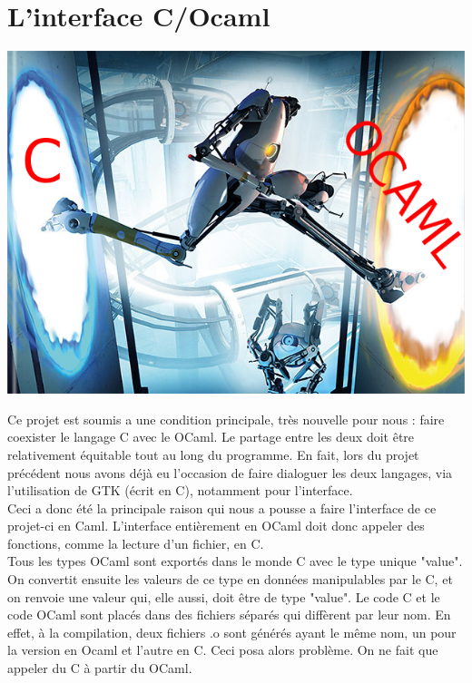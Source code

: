 \documentclass[12pt,a4paper]{report}
\begin{document}
\chapter{L'interface C/Ocaml}

\begin{center}
\includegraphics[scale=0.5]{COcaml.jpg}
\end{center}

Ce projet est soumis a une condition principale, très nouvelle pour nous : faire coexister le langage C avec le OCaml. Le partage entre les deux doit être relativement équitable tout au long du programme. En fait, lors du projet précédent nous avons déjà eu l'occasion de faire dialoguer les deux langages, via l'utilisation de GTK (écrit en C), notamment pour l'interface.\\

Ceci a donc été la principale raison qui nous a pousse a faire l'interface de ce projet-ci en Caml. L'interface entièrement en OCaml doit donc appeler des fonctions, comme la lecture d'un fichier, en C.\\

Tous les types OCaml sont exportés dans le monde C avec le type unique "value". On convertit ensuite les valeurs de ce type en données manipulables par le C, et on renvoie une valeur qui, elle aussi, doit être de type "value". Le code C et le code OCaml sont placés dans des fichiers séparés qui diffèrent par leur nom. En effet, à la compilation, deux fichiers .o sont générés ayant le même nom, un pour la version en Ocaml et l'autre en C. Ceci posa alors problème. On ne fait que appeler du C à partir du OCaml.\\
\end{document}
